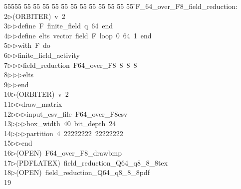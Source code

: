 %
%
\begin{tabbing}
55555 \= 55 \= 55 \= 55 \= 55 \= 55 \= 55 \= 55 \= 55 \= 55 \= 55 \= 55 \= 55 \= \>F\_64\_over\_F8\_field\_reduction:\\[0pt]
2\>$\triangleright$\>(ORBITER)\ v\ 2\ \\[0pt]
3\>$\triangleright$\>$\triangleright$\>define\ F\ finite\_field\ q\ 64\ end\ \\[0pt]
4\>$\triangleright$\>$\triangleright$\>define\ elts\ vector\ field\ F\ loop\ 0\ 64\ 1\ end\ \\[0pt]
5\>$\triangleright$\>$\triangleright$\>with\ F\ do\ \\[0pt]
6\>$\triangleright$\>$\triangleright$\>finite\_field\_activity\ \\[0pt]
7\>$\triangleright$\>$\triangleright$\>$\triangleright$\>field\_reduction\ F64\_over\_F8\ 8\ 8\ 8\ \\[0pt]
8\>$\triangleright$\>$\triangleright$\>$\triangleright$\>elts\ \\[0pt]
9\>$\triangleright$\>$\triangleright$\>end\\[0pt]
10\>$\triangleright$\>(ORBITER)\ v\ 2\ \\[0pt]
11\>$\triangleright$\>$\triangleright$\>draw\_matrix\ \\[0pt]
12\>$\triangleright$\>$\triangleright$\>$\triangleright$\>input\_csv\_file\ F64\_over\_F8csv\ \\[0pt]
13\>$\triangleright$\>$\triangleright$\>$\triangleright$\>box\_width\ 40\ bit\_depth\ 24\ \\[0pt]
14\>$\triangleright$\>$\triangleright$\>$\triangleright$\>partition\ 4\ 22222222\ 22222222\ \\[0pt]
15\>$\triangleright$\>$\triangleright$\>end\\[0pt]
16\>$\triangleright$\>(OPEN)\ F64\_over\_F8\_drawbmp\\[0pt]
17\>$\triangleright$\>(PDFLATEX)\ field\_reduction\_Q64\_q8\_8\_8tex\\[0pt]
18\>$\triangleright$\>(OPEN)\ field\_reduction\_Q64\_q8\_8\_8pdf\\[0pt]
19\>\end{tabbing}
